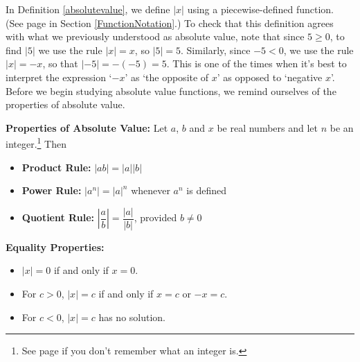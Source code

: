 \medskip

In Definition \ref{absolutevalue}, we define $|x|$ using a piecewise-defined function.  (See page \pageref{piecewisefunction} in Section \ref{FunctionNotation}.)  To check that this definition agrees with what we previously understood as absolute value, note that since $5 \geq 0$, to find $|5|$ we use the rule $|x| = x$, so $|5|=5$.  Similarly, since $-5 < 0$, we use the rule $|x| = -x$, so that $|-5| = -(-5) = 5$.  This is one of the times when it's best to interpret the expression `$-x$' as `the opposite of $x$' as opposed to `negative $x$'.  Before we begin studying absolute value functions, we remind ourselves of the properties of absolute value.

\medskip
\colorbox{ResultColor}{\bbm
\begin{thm}  \textbf{Properties of Absolute Value:} Let $a$, $b$ and $x$ be real numbers and let $n$ be an integer.\footnote{See page \pageref{setsofnumbersboxonthispage} if you don't remember what an integer is.}  Then \label{absolutevalueprops} 

\begin{itemize}

\item {\bf Product Rule:} $|ab|= |a||b|$ 

\item {\bf Power Rule:} $\left| a^{n} \right| = |a|^{n}$ whenever $a^{n}$ is defined 

\item {\bf Quotient Rule:} $\left| \dfrac{a}{b} \right| = \dfrac{|a|}{|b|}$, provided $b \neq 0$ 

\end{itemize}

{\bf Equality Properties:}

\begin{itemize}

\item  $|x| = 0$ if and only if $x = 0$.

\item  For $c > 0$, $|x| = c$ if and only if $x = c$ or $-x = c$.

\item  For $c < 0$, $|x| = c$ has no solution.

\end{itemize}

\end{thm}

\ebm}

